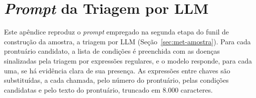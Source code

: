 \chapter{\texorpdfstring{\textit{Prompt}}{Prompt} da Triagem por LLM}\label{ap:prompt-triagem}

Este apêndice reproduz o \textit{prompt} empregado na segunda etapa do funil de construção da amostra, a triagem por LLM (Seção~\ref{sec:met-amostra}). Para cada prontuário candidato, a lista de condições é preenchida com as doenças sinalizadas pela triagem por expressões regulares, e o modelo responde, para cada uma, se há evidência clara de sua presença. As expressões entre chaves são substituídas, a cada chamada, pelo número do prontuário, pelas condições candidatas e pelo texto do prontuário, truncado em 8.000 caracteres.

\begin{small}
\end{small}
